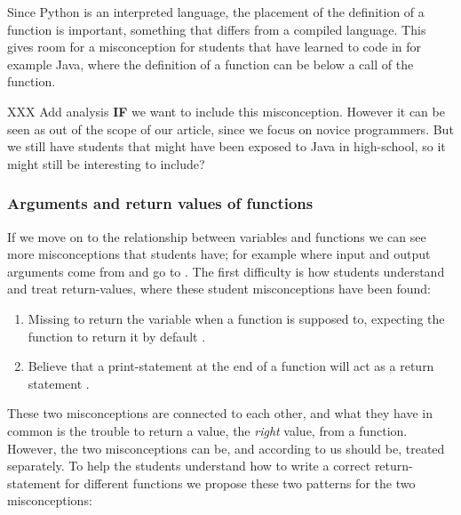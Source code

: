 Since Python is an interpreted language, the placement of the definition of 
a function is important, something that differs from a compiled language. 
This gives 
room for a misconception for students that have learned to code in for 
example Java, where the definition of a function can be below a call of the 
function. 

XXX Add analysis \textbf{IF} we want to include this misconception. However 
it can be seen as out of the scope of our article, since we focus on novice 
programmers. But we still have students that might have been exposed to 
Java in high-school, so it might still be interesting to include?

\subsubsection{Arguments and return values of functions}

If we move on to the relationship between variables and functions we can 
see 
more misconceptions that students have; for example where input and output 
arguments 
come from and go to \parencite{Ragonis2005OOP}.
The first difficulty is how students understand and treat return-values, 
where these student misconceptions have been found: 

\begin{enumerate}
    \item Missing to return the variable when a function is supposed to, 
expecting the function to return it by default \parencite{
Kurvinen2016,KumarVeerasamy2016}.

    \item Believe that a print-statement at the end of a function will act 
as a return statement \parencite{MisconceptionsSurvey2017}.

\end{enumerate}
 

These two misconceptions are connected to each other, and what they have 
in common is the trouble to return a value, the \emph{right} value, from a 
function. However, the two misconceptions can be, and according to us 
should be, treated separately. To help the students understand how to 
write a correct return-statement for different functions we propose these 
two patterns for the two misconceptions:

